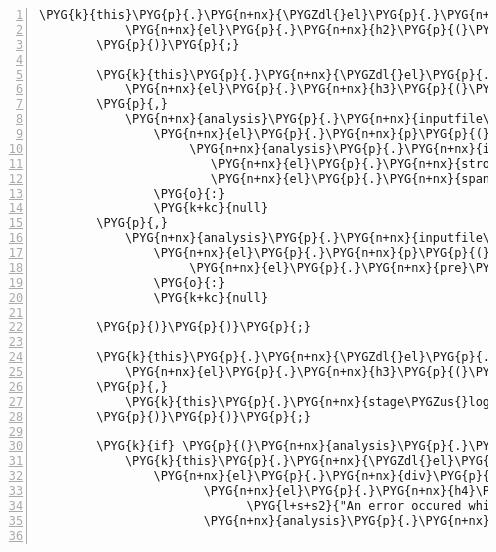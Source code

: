 \begin{Verbatim}[commandchars=\\\{\},numbers=left,firstnumber=1,stepnumber=5]
        \PYG{k}{this}\PYG{p}{.}\PYG{n+nx}{\PYGZdl{}el}\PYG{p}{.}\PYG{n+nx}{append}\PYG{p}{(}
            \PYG{n+nx}{el}\PYG{p}{.}\PYG{n+nx}{h2}\PYG{p}{(}\PYG{l+s+s2}{"Processing"}\PYG{p}{)}
        \PYG{p}{)}\PYG{p}{;}

        \PYG{k}{this}\PYG{p}{.}\PYG{n+nx}{\PYGZdl{}el}\PYG{p}{.}\PYG{n+nx}{append}\PYG{p}{(}\PYG{n+nx}{el}\PYG{p}{.}\PYG{n+nx}{div}\PYG{p}{(}
            \PYG{n+nx}{el}\PYG{p}{.}\PYG{n+nx}{h3}\PYG{p}{(}\PYG{l+s+s2}{"Input Check"}\PYG{p}{)}
        \PYG{p}{,}
            \PYG{n+nx}{analysis}\PYG{p}{.}\PYG{n+nx}{inputfile\PYGZus{}uploaded} \PYG{o}{?}
                \PYG{n+nx}{el}\PYG{p}{.}\PYG{n+nx}{p}\PYG{p}{(}\PYG{l+s+s2}{"Type of input: "}\PYG{p}{,}
                     \PYG{n+nx}{analysis}\PYG{p}{.}\PYG{n+nx}{inputfile\PYGZus{}type} \PYG{o}{?}
                        \PYG{n+nx}{el}\PYG{p}{.}\PYG{n+nx}{strong}\PYG{p}{(}\PYG{n+nx}{analysis}\PYG{p}{.}\PYG{n+nx}{inputfile\PYGZus{}type}\PYG{p}{)} \PYG{o}{:}
                        \PYG{n+nx}{el}\PYG{p}{.}\PYG{n+nx}{span}\PYG{p}{(}\PYG{l+s+s2}{"not detected"}\PYG{p}{)}\PYG{p}{)}
                \PYG{o}{:}
                \PYG{k+kc}{null}
        \PYG{p}{,}
            \PYG{n+nx}{analysis}\PYG{p}{.}\PYG{n+nx}{inputfile\PYGZus{}header} \PYG{o}{?}
                \PYG{n+nx}{el}\PYG{p}{.}\PYG{n+nx}{p}\PYG{p}{(}\PYG{l+s+s2}{"First read in input data: "}\PYG{p}{,}
                     \PYG{n+nx}{el}\PYG{p}{.}\PYG{n+nx}{pre}\PYG{p}{(}\PYG{n+nx}{analysis}\PYG{p}{.}\PYG{n+nx}{inputfile\PYGZus{}header}\PYG{p}{)}\PYG{p}{)}
                \PYG{o}{:}
                \PYG{k+kc}{null}

        \PYG{p}{)}\PYG{p}{)}\PYG{p}{;}

        \PYG{k}{this}\PYG{p}{.}\PYG{n+nx}{\PYGZdl{}el}\PYG{p}{.}\PYG{n+nx}{append}\PYG{p}{(}\PYG{n+nx}{el}\PYG{p}{.}\PYG{n+nx}{div}\PYG{p}{(}
            \PYG{n+nx}{el}\PYG{p}{.}\PYG{n+nx}{h3}\PYG{p}{(}\PYG{l+s+s2}{"Stage Logs"}\PYG{p}{)}
        \PYG{p}{,}
            \PYG{k}{this}\PYG{p}{.}\PYG{n+nx}{stage\PYGZus{}logs}
        \PYG{p}{)}\PYG{p}{)}\PYG{p}{;}

        \PYG{k}{if} \PYG{p}{(}\PYG{n+nx}{analysis}\PYG{p}{.}\PYG{n+nx}{error}\PYG{p}{)}
            \PYG{k}{this}\PYG{p}{.}\PYG{n+nx}{\PYGZdl{}el}\PYG{p}{.}\PYG{n+nx}{append}\PYG{p}{(}
                \PYG{n+nx}{el}\PYG{p}{.}\PYG{n+nx}{div}\PYG{p}{(}\PYG{p}{\PYGZob{}}\PYG{k+kr}{class}\PYG{o}{:} \PYG{l+s+s2}{"alert alert-error"}\PYG{p}{\PYGZcb{}}\PYG{p}{,}
                       \PYG{n+nx}{el}\PYG{p}{.}\PYG{n+nx}{h4}\PYG{p}{(}\PYG{p}{\PYGZob{}}\PYG{k+kr}{class}\PYG{o}{:} \PYG{l+s+s2}{"alert-heading"}\PYG{p}{\PYGZcb{}}\PYG{p}{,}
                             \PYG{l+s+s2}{"An error occured while analyzing the data"}\PYG{p}{)}\PYG{p}{,}
                       \PYG{n+nx}{analysis}\PYG{p}{.}\PYG{n+nx}{error}\PYG{p}{)}\PYG{p}{)}\PYG{p}{;}


\end{Verbatim}
